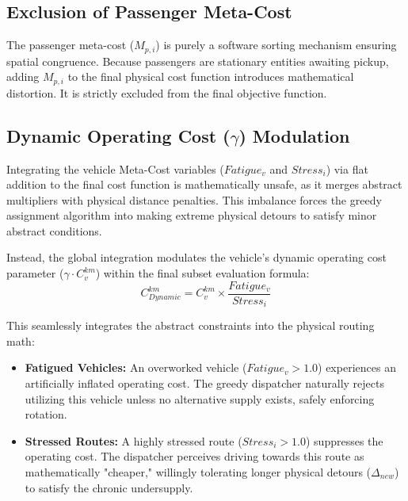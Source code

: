 \documentclass[12pt,a4paper]{article}
\begin{document}
\subsection{Exclusion of Passenger Meta-Cost}
The passenger meta-cost ($M_{p, i}$) is purely a software sorting mechanism ensuring spatial congruence. Because passengers are stationary entities awaiting pickup, adding $M_{p, i}$ to the final physical cost function introduces mathematical distortion. It is strictly excluded from the final objective function.

\subsection{Dynamic Operating Cost ($\gamma$) Modulation}
Integrating the vehicle Meta-Cost variables ($Fatigue_v$ and $Stress_i$) via flat addition to the final cost function is mathematically unsafe, as it merges abstract multipliers with physical distance penalties. This imbalance forces the greedy assignment algorithm into making extreme physical detours to satisfy minor abstract conditions.

Instead, the global integration modulates the vehicle's dynamic operating cost parameter ($\gamma \cdot C^{km}_v$) within the final subset evaluation formula:
\begin{equation}
    C^{km}_{Dynamic} = C^{km}_v \times \frac{Fatigue_v}{Stress_i}
\end{equation}

This seamlessly integrates the abstract constraints into the physical routing math:
\begin{itemize}
    \item \textbf{Fatigued Vehicles:} An overworked vehicle ($Fatigue_v > 1.0$) experiences an artificially inflated operating cost. The greedy dispatcher naturally rejects utilizing this vehicle unless no alternative supply exists, safely enforcing rotation.
    \item \textbf{Stressed Routes:} A highly stressed route ($Stress_i > 1.0$) suppresses the operating cost. The dispatcher perceives driving towards this route as mathematically "cheaper," willingly tolerating longer physical detours ($\Delta_{new}$) to satisfy the chronic undersupply.
\end{itemize}
\end{document}
